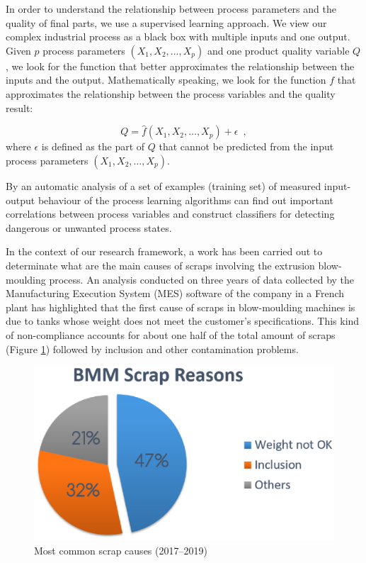 In order to understand the relationship between process parameters and the quality of final parts, we use a supervised learning approach. We view our complex industrial process as a black box with multiple inputs and one output. Given $p$ process parameters $(X_1,X_2,\ldots,X_p)$ and one product quality variable $Q$, we look for the function that better approximates the relationship between the inputs and the output. Mathematically speaking, we look for the function $f$ that approximates the relationship between the process variables and the quality result:

\begin{equation}
    Q = \hat{f}(X_1,X_2,\ldots,X_p) + \epsilon
    \enspace,
\end{equation}
where $\epsilon$ is defined as the part of $Q$ that cannot be predicted from the input process parameters $(X_1,X_2,\ldots,X_p)$.

By an automatic analysis of a set of examples (training set) of measured input-output behaviour of the process learning algorithms can find out important correlations between process variables and construct classifiers for detecting dangerous or unwanted process states.

In the context of our research framework, a work has been carried out to determinate what are the main causes of scraps involving the extrusion blow-moulding process. An analysis conducted on three years of data collected by the Manufacturing Execution System (MES) software of the company in a French plant has highlighted that the first cause of scraps in blow-moulding machines is due to tanks whose weight does not meet the customer's specifications. This kind of non-compliance accounts for about one half of the total amount of scraps (Figure \ref{fig:Most common scrap causes (2017-2018-2019)}) followed by inclusion and other contamination problems. 

\begin{figure}
\centerline{\includegraphics[scale=0.9]{images/chapter_3/Scraps_codes.eps}}
\caption{Most common scrap causes (2017--2019)}
\label{fig:Most common scrap causes (2017-2018-2019)}
\end{figure}

